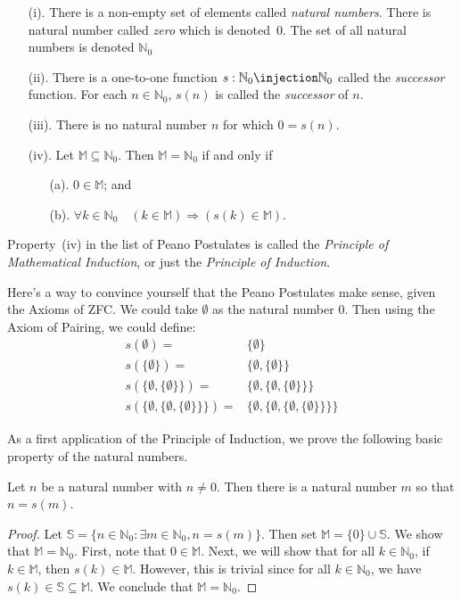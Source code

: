 \begin{enumerate}
\item[(i).] There is a non-empty set of elements called 
\textit{natural numbers}.  There is natural number
called \textit{zero} which is denoted~$0$.  The set of all natural
numbers is denoted $\mathbb{N}_0$
\item[(ii).] There is a one-to-one function $s:\mathbb{N}_0
\injection \mathbb{N}_0$
called the \textit{successor} function.  For each $n\in \mathbb{N}_0$,
$s(n)$ is called the \textit{successor} of $n$.
\item[(iii).] There is no natural number $n$ for which $0=s(n)$.
\item[(iv).] Let $\mathbb{M}\subseteq \mathbb{N}_0$.  
Then $\mathbb{M} =\mathbb{N}_0$ if and only if
\begin{enumerate}
\item[(a).] $0\in \mathbb{M}$; and 
\item[(b).] $\forall k\in \mathbb{N}_0\quad(k\in \mathbb{M}) 
  \Longrightarrow(s(k)\in \mathbb{M})$. 
\end{enumerate}
\end{enumerate}

Property~(iv) in the list of Peano Postulates is called 
the \textit{Principle of Mathematical Induction}, or
just the \textit{Principle of Induction}.

Here's a way to convince yourself that the Peano Postulates
make sense, given the Axioms of ZFC.  We could take $\emptyset$ as
the natural number $0$.  Then using the Axiom of Pairing,
we could define: 
\begin{align*}
s(\emptyset) =&\{\emptyset\}\\
s(\{\emptyset\})=&\{\emptyset,\{\emptyset\}\}\\
s(\{\emptyset,\{\emptyset\}\})=&
\{\emptyset,\{\emptyset,\{\emptyset\}\}\} \\
s(\{\emptyset,\{\emptyset,\{\emptyset\}\}\})=&
\{\emptyset,\{\emptyset,\{\emptyset,\{\emptyset\}\}\}\}
\end{align*}

As a first application of the Principle of Induction, we prove the following
basic property of the natural numbers.

\begin{proposition}
Let $n$ be a natural number with $n\neq0$.  Then there is a
natural number $m$ so that $n=s(m)$.
\end{proposition}
\begin{proof}
Let $\mathbb{S}=\{n\in\mathbb{N}_0:\exists m\in\mathbb{N}_0,
n=s(m)\}$.  Then set $\mathbb{M}=\{0\}\cup\mathbb{S}$.
We show that $\mathbb{M}=\mathbb{N}_0$.  First, note that
$0\in\mathbb{M}$.  Next, we will show that for all $k\in\mathbb{N}_0$,
if $k\in\mathbb{M}$, then $s(k)\in\mathbb{M}$. However, this is trivial
since for all $k\in\mathbb{N}_0$, we have 
$s(k)\in\mathbb{S}\subseteq\mathbb{M}$.
We conclude that $\mathbb{M}=\mathbb{N}_0$.
\end{proof}

